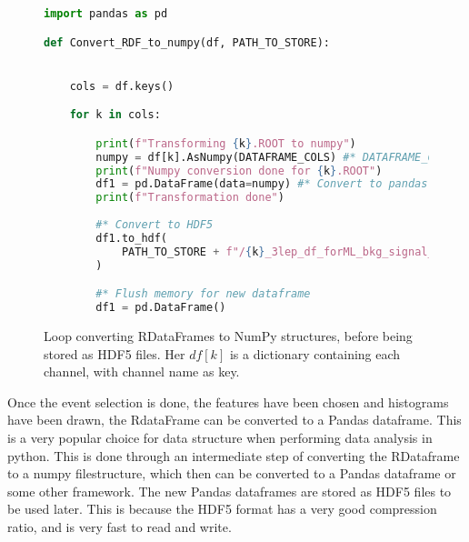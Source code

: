 \begin{figure}[h!]
    \centering
\begin{lstlisting}[language=Python, style=pythonstyle, label={code:python_func_example_2}]
import pandas as pd 

def Convert_RDF_to_numpy(df, PATH_TO_STORE):


    cols = df.keys()

    for k in cols:

        print(f"Transforming {k}.ROOT to numpy")
        numpy = df[k].AsNumpy(DATAFRAME_COLS) #* DATAFRAME_COLS is a list of columns to be converted to a numpy array
        print(f"Numpy conversion done for {k}.ROOT")
        df1 = pd.DataFrame(data=numpy) #* Convert to pandas dataframe
        print(f"Transformation done")
        
        #* Convert to HDF5
        df1.to_hdf(
            PATH_TO_STORE + f"/{k}_3lep_df_forML_bkg_signal_fromRDF.hdf5", "mini"
        )

        #* Flush memory for new dataframe
        df1 = pd.DataFrame()

\end{lstlisting}
\caption[Conversion from RDataFrame to NumPy]{Loop converting RDataFrames to NumPy structures, before being stored as HDF5 files.
Her $df[k]$ is a dictionary containing each channel, with channel name as key.}
\end{figure}

Once the event selection is done, the features have been chosen and histograms have been 
drawn, the RdataFrame can be converted to a Pandas dataframe. This is a very popular 
choice for data structure when performing data analysis in python. This is done through an 
intermediate step of converting the RDataframe to a numpy filestructure, which then can 
be converted to a Pandas\cite{reback2020pandas} dataframe or some other framework.
The new Pandas dataframes are stored as HDF5\cite{hdf5} files to be used later. This is 
because the HDF5 format has a very good compression ratio, and is very fast to read and write. 